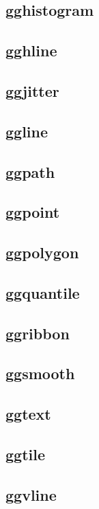 \subsection{gghistogram}\label{sub:gghistogram}
\subsection{gghline}\label{sub:gghline}
\subsection{ggjitter}\label{sub:ggjitter}
\subsection{ggline}\label{sub:ggline}
\subsection{ggpath}\label{sub:ggpath}
\subsection{ggpoint}\label{sub:ggpoint}
\subsection{ggpolygon}\label{sub:ggpolygon}
\subsection{ggquantile}\label{sub:ggquantile}
\subsection{ggribbon}\label{sub:ggribbon}
\subsection{ggsmooth}\label{sub:ggsmooth}
\subsection{ggtext}\label{sub:ggtext}
\subsection{ggtile}\label{sub:ggtile}
\subsection{ggvline}\label{sub:ggvline}


